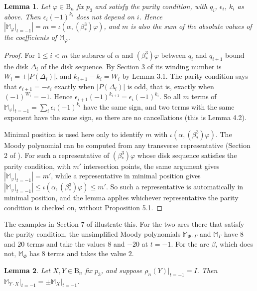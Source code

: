 \documentclass[11pt]{amsart}
\newtheorem{lemma}{Lemma}
\theoremstyle{remark}
\newcommand{\M}{\mathbb{M}}
\newcommand{\B}{\mathrm{B}}
\newcommand{\bs}{\beta^3_*}
\newcommand{\at}{\big|_{t=-1}}
\begin{document}
\begin{lemma}\label{lem:sign}
Let $\varphi\in \B_n$ fix $p_3$ and satisfy the parity condition, with $q_i$, $\epsilon_i$, $k_i$ as above. Then $\epsilon_i(-1)^{k_i}$ does not depend on $i$. Hence $|\M_\varphi\at|=m=\iota(\alpha,(\bs)\varphi)$, and $m$ is also the sum of the absolute values of the coefficients of $\M_\varphi$.
\end{lemma}

\begin{proof}
For $1\le i<m$ the subarcs of $\alpha$ and $(\bs)\varphi$ between $q_i$ and $q_{i+1}$ bound the disk $\Delta_i$ of the disk sequence. By Section 3 of \cite{BBB} its winding number is $W_i=\pm|P(\Delta_i)|$, and $k_{i+1}-k_i=W_i$ by Lemma 3.1. The parity condition says that $\epsilon_{i+1}=-\epsilon_i$ exactly when $|P(\Delta_i)|$ is odd, that is, exactly when $(-1)^{W_i}=-1$. Hence $\epsilon_{i+1}(-1)^{k_{i+1}}=\epsilon_i(-1)^{k_i}$. So all $m$ terms of $\M_\varphi\at=\sum_i\epsilon_i(-1)^{k_i}$ have the same sign, and two terms with the same exponent have the same sign, so there are no cancellations (this is Lemma 4.2).

Minimal position is used here only to identify $m$ with $\iota(\alpha,(\bs)\varphi)$. The Moody polynomial can be computed from any transverse representative (Section 2 of \cite{BBB}). For such a representative of $(\bs)\varphi$ whose disk sequence satisfies the parity condition, with $m'$ intersection points, the same argument gives $|\M_\varphi\at|=m'$, while a representative in minimal position gives $|\M_\varphi\at|\le\iota(\alpha,(\bs)\varphi)\le m'$. So such a representative is automatically in minimal position, and the lemma applies whichever representative the parity condition is checked on, without Proposition 5.1.
\end{proof}

The examples in Section 7 of \cite{BBB} illustrate this. For the two arcs there that satisfy the parity condition, the unsimplified Moody polynomials $\M_{\Phi\cdot\Gamma}$ and $\M_\Gamma$ have $8$ and $20$ terms and take the values $8$ and $-20$ at $t=-1$. For the arc $\beta$, which does not, $\M_\Phi$ has $8$ terms and takes the value $2$.

\begin{lemma}\label{lem:tminus1}
Let $X,Y\in \B_n$ fix $p_3$, and suppose $\rho_n(Y)\at=I$. Then $\M_{Y\cdot X}\at=\pm\M_X\at$.
\end{lemma}
\end{document}
